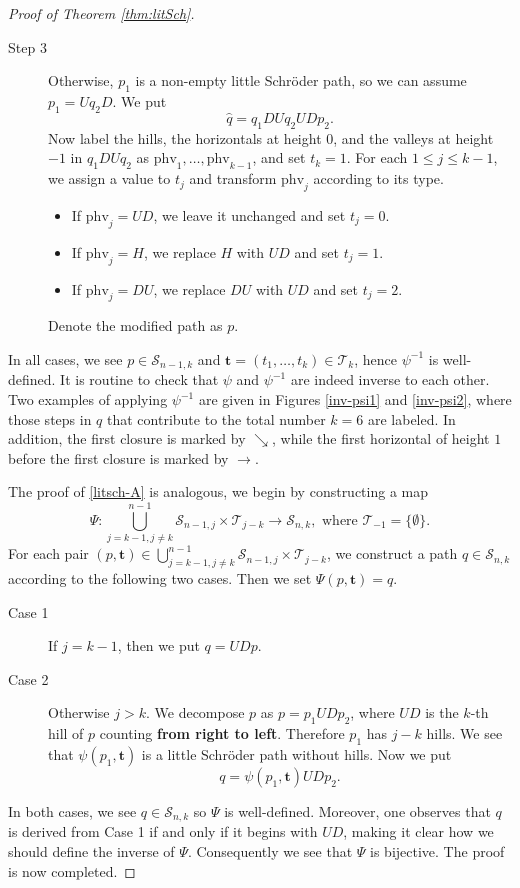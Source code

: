 \documentclass[11pt,reqno]{amsart}
\numberwithin{equation}{section}
\theoremstyle{plain}
\theoremstyle{definition}
\newcommand{\s}{\mathcal{S}}
\newcommand{\T}{\mathcal{T}}
\begin{document}
\begin{proof}[Proof of Theorem \ref{thm:litSch}]
\begin{description}
	\item[Step 3] Otherwise, $p_1$ is a non-empty little Schr\"oder path, so we can assume $p_1=Uq_2D$. We put $$\hat{q}=q_1DUq_2UDp_2.$$ Now label the hills, the horizontals at height $0$, and the valleys at height $-1$ in $q_1DUq_2$ as $\mathrm{phv}_1,\ldots,\mathrm{phv}_{k-1}$, and set $t_k=1$. For each $1\le j\le k-1$, we assign a value to $t_j$ and transform $\mathrm{phv}_j$ according to its type.
\begin{itemize}
\item If $\mathrm{phv}_j=UD$, we leave it unchanged and set $t_j=0$.
\item If $\mathrm{phv}_j=H$, we replace $H$ with $UD$ and set $t_j=1$.
\item If $\mathrm{phv}_j=DU$, we replace $DU$ with $UD$ and set $t_j=2$.
\end{itemize}
Denote the modified path as $p$.
\end{description}

In all cases, we see $p\in\s_{n-1,k}$ and $\mathbf{t}=(t_1,\ldots,t_k)\in\T_k$, hence $\psi^{-1}$ is well-defined. It is routine to check that $\psi$ and $\psi^{-1}$ are indeed inverse to each other. Two examples of applying $\psi^{-1}$ are given in Figures \ref{inv-psi1} and \ref{inv-psi2}, where those steps in $q$ that contribute to the total number $k=6$ are labeled. In addition, the first closure is marked by $\searrow$, while the first horizontal of height $1$ before the first closure is marked by $\rightarrow$.

The proof of \eqref{litsch-A} is analogous, we begin by constructing a map
$$\Psi:\bigcup_{j=k-1,j\neq k}^{n-1}\s_{n-1,j}\times\T_{j-k}\rightarrow \s_{n,k}, \text{ where }\T_{-1}=\{\emptyset\}.$$
For each pair $(p,\mathbf{t})\in\bigcup_{j=k-1,j\neq k}^{n-1}\s_{n-1,j}\times\T_{j-k}$, we construct a path $q\in\s_{n,k}$ according to the following two cases. Then we set $\Psi(p,\mathbf{t})=q$.
\begin{description}
\item[Case 1] If $j=k-1$, then we put $q=UDp$.
\item[Case 2] Otherwise $j> k$. We decompose $p$ as $p=p_1UDp_2$, where $UD$ is the $k$-th hill of $p$ counting {\bf from right to left}. Therefore $p_1$ has $j-k$ hills. We see that $\psi(p_1,\mathbf{t})$ is a little Schr\"oder path without hills. Now we put $$q=\psi(p_1,\mathbf{t})UDp_2.$$
\end{description}
In both cases, we see $q\in\s_{n,k}$ so $\Psi$ is well-defined. Moreover, one observes that $q$ is derived from Case 1 if and only if it begins with $UD$, making it clear how we should define the inverse of $\Psi$. Consequently we see that $\Psi$ is bijective. The proof is now completed.
\end{proof}
\end{document}
